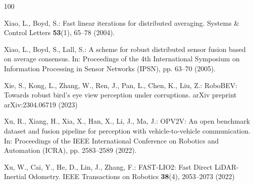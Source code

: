 \documentclass[graybox,envcountchap]{style/SNmono}
\begin{document}
\begin{thebibliography}{100}
{\par}

Xiao, L., Boyd, S.: Fast linear iterations for distributed averaging.
\newblock Systems \& Control Letters \textbf{53}(1), 65--78 (2004).
\newblock {}



Xiao, L., Boyd, S., Lall, S.: A scheme for robust distributed sensor fusion
  based on average consensus.
\newblock In: Proceedings of the 4th International Symposium on Information
  Processing in Sensor Networks (IPSN), pp. 63--70 (2005).
\newblock {}


{\color{red} 
Xie, S., Kong, L., Zhang, W., Ren, J., Pan, L., Chen, K., Liu, Z.: {RoboBEV}:
  Towards robust bird's eye view perception under corruptions.
\newblock arXiv preprint arXiv:2304.06719  (2023)

\par}

Xu, R., Xiang, H., Xia, X., Han, X., Li, J., Ma, J.: {OPV2V}: An open benchmark
  dataset and fusion pipeline for perception with vehicle-to-vehicle
  communication.
\newblock In: Proceedings of the IEEE International Conference on Robotics and
  Automation (ICRA), pp. 2583--2589 (2022).
\newblock {}


{\color{red} 
Xu, W., Cai, Y., He, D., Lin, J., Zhang, F.: {FAST-LIO2: Fast Direct
  LiDAR-Inertial Odometry}.
\newblock IEEE Transactions on Robotics \textbf{38}(4), 2053--2073 (2022)

\par}
\end{thebibliography}
\end{document}
